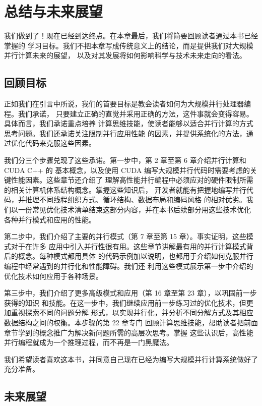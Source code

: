 \chapter{总结与未来展望}
\label{chap:conclusion-future-outlook}
\chaptercontents

我们做到了！现在已经到达终点。在本章最后，我们将简要回顾读者通过本书已经掌握的
学习目标。我们不把本章写成传统意义上的结论，而是提供我们对大规模并行计算未来的展望，
以及对其发展将如何影响科学与技术未来走向的看法。

\section{回顾目标}
\label{sec:goals-revisited}

正如我们在引言中所说，我们的首要目标是教会读者如何为大规模并行处理器编程。我们承诺，
只要建立正确的直觉并采用正确的方法，这件事就会变得容易。具体而言，我们承诺重点培养
计算思维技能，使读者能够以适合并行计算的方式思考问题。我们还承诺关注限制并行应用性能
的因素，并提供系统化的方法，通过优化代码来克服这些因素。

我们分三个步骤兑现了这些承诺。第一步中，第 2 章至第 6 章介绍并行计算和 CUDA C++ 的
基本概念，以及使用 CUDA 编写大规模并行代码时需要考虑的关键性能因素。这些章节还介绍了
理解高性能并行编程中必须应对的硬件限制所需的相关计算机体系结构概念。掌握这些知识后，
开发者就能有把握地编写并行代码，并推理不同线程组织方式、循环结构、数据布局和编码风格
的相对优劣。我们以一份常见优化技术清单结束这部分内容，并在本书后续部分用这些技术优化
各种并行模式和应用的性能。

第二步中，我们介绍了主要的并行模式（第 7 章至第 15 章）。事实证明，这些模式对于在许多
应用中引入并行性很有用。这些章节讲解最有用的并行计算模式背后的概念。每种模式都用具体
的代码示例加以说明，也都用于介绍如何克服并行编程中经常遇到的并行化和性能障碍。我们还
利用这些模式展示第一步中介绍的优化技术如何应用于各种场景。

第三步中，我们介绍了更多高级模式和应用（第 16 章至第 23 章），以巩固前一步获得的知识
和技能。在这一步中，我们继续应用前一步练习过的优化技术，但更加重视探索不同的问题分解
形式，以实现并行化，并分析不同分解方式及其相应数据结构之间的权衡。本步骤的第 22 章专门
回顾计算思维技能，帮助读者把前面章节学到的概念推广为解决新问题所需的高层次思考。掌握
这些认识后，高性能并行编程就成为一个推理过程，而不再是一门黑魔法。

我们希望读者喜欢这本书，并同意自己现在已经为编写大规模并行计算系统做好了充分准备。

\section{未来展望}
\label{sec:future-outlook}


